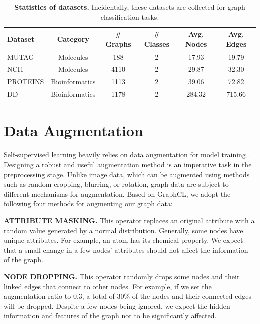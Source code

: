 \begin{table}[!htbp]
\centering
\begin{tabular}{l|c|c|c|c|c}
\toprule
Dataset & Category & \# Graphs & \# Classes & Avg. Nodes & Avg. Edges \\ 
\midrule
MUTAG \cite{mutag} & Molecules & 188 & 	2	&17.93&	19.79 \\
NCI1 \cite{nci1} & Molecules & 4110	&2&	29.87&	32.30 \\
\midrule
PROTEINS \cite{proteins} & Bioinformatics & 1113	&2	&39.06&	72.82 \\
DD \cite{proteins} & Bioinformatics & 1178&	2	&284.32&	715.66 \\
\bottomrule
\end{tabular}
\vspace{0.5cm}
\caption[Statistics of datasets]{\textbf{Statistics of datasets.} Incidentally, these datasets are collected for graph classification tasks. }
		\label{tab:dataset}
	\end{table}
	
	


\section{Data Augmentation}

Self-supervised learning heavily relies on data augmentation for model training \cite{ding2022data, zhao2022graph}. Designing a robust and useful augmentation method is an imperative task in the preprocessing stage. Unlike image data, which can be augmented using methods such as random cropping, blurring, or rotation, graph data are subject to different mechanisms for augmentation. Based on GraphCL, we adopt the following four methods for augmenting our graph data:

\textbf{\uppercase{attribute masking.}} This operator replaces an original attribute with a random value generated by a normal distribution. Generally, some nodes have unique attributes. For example, an atom has its chemical property. We expect that a small change in a few nodes' attributes should not affect the information of the graph. 
		
\textbf{\uppercase{node dropping.}} This operator randomly drops some nodes and their linked edges that connect to other nodes. For example, if we set the augmentation ratio to $0.3$, a total of 30\% of the nodes and their connected edges will be dropped. Despite a few nodes being ignored, we expect the hidden information and features of the graph not to be significantly affected.	

